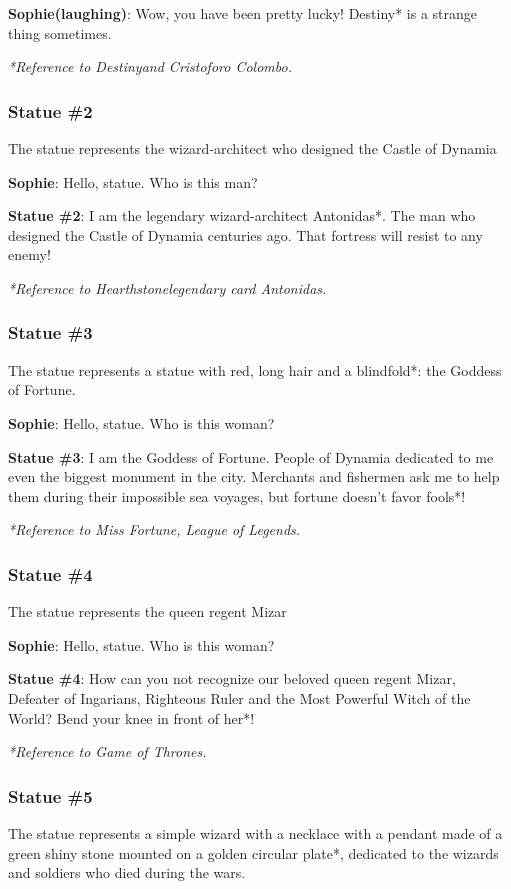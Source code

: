 \textbf{Sophie(laughing)}: Wow, you have been pretty lucky! Destiny* is a strange thing sometimes.

\textit{*Reference to Destiny\texttrademark and Cristoforo Colombo.}

\subsubsection*{Statue \#{}2}
The statue represents the wizard-architect who designed the Castle of Dynamia

\textbf{Sophie}: Hello, statue. Who is this man?

\textbf{Statue \#{}2}: I am the legendary wizard-architect Antonidas*. The man who designed the Castle of Dynamia centuries ago. That fortress will resist to any enemy!


\textit{*Reference to Hearthstone\texttrademark legendary card Antonidas.}

\subsubsection*{Statue \#{}3}
The statue represents a statue with red, long hair and a blindfold*: the Goddess of Fortune.

\textbf{Sophie}: Hello, statue. Who is this woman?

\textbf{Statue \#{}3}: I am the Goddess of Fortune. People of Dynamia dedicated to me even the biggest monument in the city. Merchants and fishermen ask me to help them during their impossible sea voyages, but fortune doesn't favor fools*!

\textit{*Reference to Miss Fortune, League of Legends\texttrademark{}.}

\subsubsection*{Statue \#{}4}
The statue represents the queen regent Mizar

\textbf{Sophie}: Hello, statue. Who is this woman?

\textbf{Statue \#{}4}: How can you not recognize our beloved queen regent Mizar, Defeater of Ingarians, Righteous Ruler and the Most Powerful Witch of the World? Bend your knee in front of her*!

\textit{*Reference to Game of Thrones\texttrademark{}.}

\subsubsection*{Statue \#{}5}
The statue represents a simple wizard with a necklace with a pendant made of a green shiny stone mounted on a golden circular plate*, dedicated to the wizards and soldiers who died during the wars.

